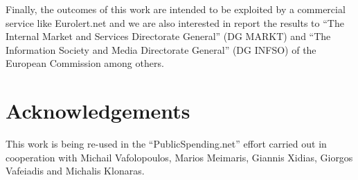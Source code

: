 \documentclass[preprint,12pt]{elsarticle}
\begin{document}
Finally, the outcomes of this work are intended to be exploited by a commercial service like 
Eurolert.net and we are also interested in report the results to ``The 
Internal Market and Services Directorate General'' (DG MARKT) and ``The Information Society and Media Directorate General'' 
(DG INFSO) of the European Commission among others.


\section{Acknowledgements}
This work is being re-used in the ``PublicSpending.net'' effort carried out in cooperation with Michail Vafolopoulos, Marios Meimaris, Giannis Xidias,
Giorgos Vafeiadis and Michalis Klonaras.

\clearpage



\end{document}
